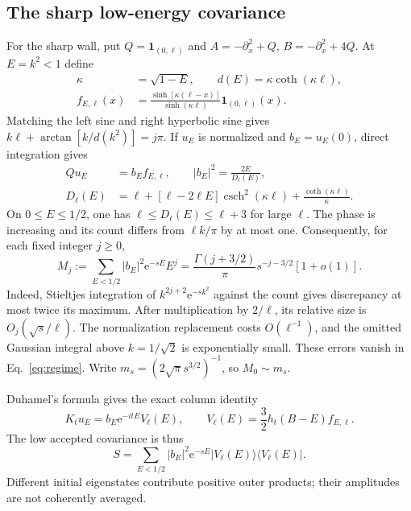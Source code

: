 \documentclass[aps,pra,reprint,superscriptaddress,longbibliography]{revtex4-2}
\newcommand{\ee}{\mathrm e}
\newcommand{\ket}[1]{\lvert#1\rangle}
\newcommand{\bra}[1]{\langle#1\rvert}
\newcommand{\one}{\mathbf 1}
\begin{document}
\subsection{The sharp low-energy covariance}

For the sharp wall, put $Q=\one_{(0,\ell)}$ and
$A=-\partial_x^2+Q$, $B=-\partial_x^2+4Q$. At $E=k^2<1$ define
\begin{align}
 \kappa&=\sqrt{1-E},\qquad d(E)=\kappa\coth(\kappa\ell),\nonumber\\
 f_{E,\ell}(x)&=\frac{\sinh[\kappa(\ell-x)]}
                         {\sinh(\kappa\ell)}\one_{(0,\ell)}(x).
                                                        \label{eq:ctrlf}
\end{align}
Matching the left sine and right hyperbolic sine gives
$k\ell+\arctan[k/d(k^2)]=j\pi$. If $u_E$ is normalized and
$b_E=u_E(0)$, direct integration gives
\begin{align}
 Qu_E&=b_E f_{E,\ell},\qquad |b_E|^2=\frac{2E}{D_\ell(E)},\nonumber\\
 D_\ell(E)&=\ell+[\ell-2\ell E]\operatorname{csch}^2(\kappa\ell)
                       +\frac{\coth(\kappa\ell)}\kappa.
                                                        \label{eq:ctrlamp}
\end{align}
On $0\le E\le1/2$, one has
$\ell\le D_\ell(E)\le\ell+3$ for large $\ell$.
The phase is increasing and its count differs from $\ell k/\pi$
by at most one. Consequently, for each fixed integer $j\ge0$,
\begin{equation}
 M_j:=\sum_{E<1/2}|b_E|^2\ee^{-sE}E^j
 =\frac{\Gamma(j+3/2)}\pi s^{-j-3/2}[1+o(1)].
                                                        \label{eq:ctrlmom}
\end{equation}
Indeed, Stieltjes integration of $k^{2j+2}\ee^{-sk^2}$ against
the count gives discrepancy at most twice its maximum. After
multiplication by $2/\ell$, its relative size is
$O_j(\sqrt s/\ell)$. The normalization replacement costs
$O(\ell^{-1})$, and the omitted Gaussian integral above
$k=1/\sqrt2$ is exponentially small. These errors vanish in
Eq.~\eqref{eq:regime}. Write
$m_s=(2\sqrt\pi s^{3/2})^{-1}$, so $M_0\sim m_s$.

Duhamel's formula gives the exact column identity
\begin{equation}
 K_tu_E=b_E\ee^{-itE}V_\ell(E),\qquad
 V_\ell(E)=\frac32h_t(B-E)f_{E,\ell}.
                                                        \label{eq:ctrlcolumn}
\end{equation}
The low accepted covariance is thus
\begin{equation}
 S=\sum_{E<1/2}|b_E|^2\ee^{-sE}
                 \ket{V_\ell(E)}\bra{V_\ell(E)}.
                                                        \label{eq:ctrlcov}
\end{equation}
Different initial eigenstates contribute positive outer products;
their amplitudes are not coherently averaged.
\end{document}
